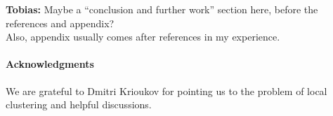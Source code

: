 \documentclass[a4paper,10pt]{article}
\newcommand{\1}{\mathds{1}}								%
\newcommand{\BL}[1]{{{\color{blue} #1}}}
\newcommand{\TM}[1]{\BL{{\bf Tobias:} #1}}
\begin{document}


















\TM{ Maybe a ``conclusion and further work'' section here,  before the references and appendix? \\
Also, appendix usually comes after references in my experience.}

\paragraph{Acknowledgments} We are grateful to Dmitri Krioukov for pointing us to the problem of local clustering and helpful discussions.






\end{document}
